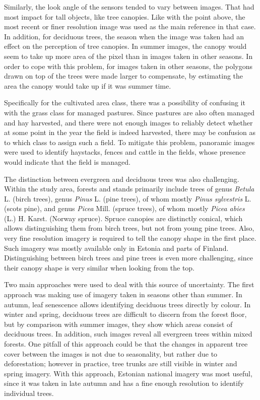 \documentclass[a4paper,12pt]{scrbook}
\begin{document}
Similarly, the look angle of the sensors tended to vary between images. That had most impact for tall objects, like tree canopies. Like with the point above, the most recent or finer resolution image was used as the main reference in that case. In addition, for deciduous trees, the season when the image was taken had an effect on the perception of tree canopies. In summer images, the canopy would seem to take up more area of the pixel than in images taken in other seasons. In order to cope with this problem, for images taken in other seasons, the polygons drawn on top of the trees were made larger to compensate, by estimating the area the canopy would take up if it was summer time.

Specifically for the cultivated area class, there was a possibility of confusing it with the grass class for managed pastures. Since pastures are also often managed and hay harvested, and there were not enough images to reliably detect whether at some point in the year the field is indeed harvested, there may be confusion as to which class to assign such a field. To mitigate this problem, panoramic images were used to identify haystacks, fences and cattle in the fields, whose presence would indicate that the field is managed.

The distinction between evergreen and deciduous trees was also challenging. Within the study area, forests and stands primarily include trees of genus \textit{Betula} L. (birch trees), genus \textit{Pinus} L. (pine trees), of whom mostly \textit{Pinus sylvestris} L. (scots pine), and genus \textit{Picea} Mill. (spruce trees), of whom mostly \textit{Picea abies} (L.) H. Karst. (Norway spruce). Spruce canopies are distinctly conical, which allows distinguishing them from birch trees, but not from young pine trees. Also, very fine resolution imagery is required to tell the canopy shape in the first place. Such imagery was mostly available only in Estonia and parts of Finland. Distinguishing between birch trees and pine trees is even more challenging, since their canopy shape is very similar when looking from the top.

Two main approaches were used to deal with this source of uncertainty. The first approach was making use of imagery taken in seasons other than summer. In autumn, leaf senescence allows identifying deciduous trees directly by colour. In winter and spring, deciduous trees are difficult to discern from the forest floor, but by comparison with summer images, they show which areas consist of deciduous trees. In addition, such images reveal all evergreen trees within mixed forests. One pitfall of this approach could be that the changes in apparent tree cover between the images is not due to seasonality, but rather due to deforestation; however in practice, tree trunks are still visible in winter and spring imagery. With this approach, Estonian national imagery was most useful, since it was taken in late autumn and has a fine enough resolution to identify individual trees.
\end{document}
